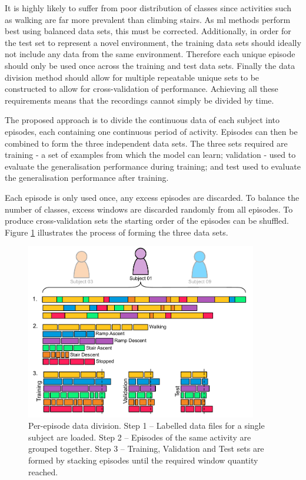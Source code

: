 It is highly likely to suffer from poor distribution of classes since activities such as walking are far more prevalent than climbing stairs. As \acrshort{ml} methods perform best using balanced data sets, this must be corrected. Additionally, in order for the test set to represent a novel environment, the training data sets should ideally not include any data from the same environment. Therefore each unique episode should only be used once across the training and test data sets. Finally the data division method should allow for multiple repeatable unique sets to be constructed to allow for cross-validation of performance. Achieving all these requirements means that the recordings cannot simply be divided by time.

The proposed approach is to divide the continuous data of each subject into episodes, each containing one continuous period of activity. Episodes can then be combined to form the three independent data sets. The three sets required are training - a set of examples from which the model can learn; validation - used to evaluate the generalisation performance during training; and test used to evaluate the generalisation performance after training.

Each episode is only used once, any excess episodes are discarded. To balance the number of classes, excess windows are discarded randomly from all episodes. To produce cross-validation sets the starting order of the episodes can be shuffled. Figure \ref{fig:methods-per-episode-data-division} illustrates the process of forming the three data sets.

\begin{figure}[hbt]
     \centering
     \includegraphics[width=0.9\textwidth]{content/5-Personalisation/Episode_Division.pdf}
     \caption[Per-episode data division]{Per-episode data division. Step 1 -- Labelled data files for a single subject are loaded. Step 2 -- Episodes of the same activity are grouped together. Step 3 -- Training, Validation and Test sets are formed by stacking episodes until the required window quantity reached.}
     \label{fig:methods-per-episode-data-division}
 \end{figure}
 
